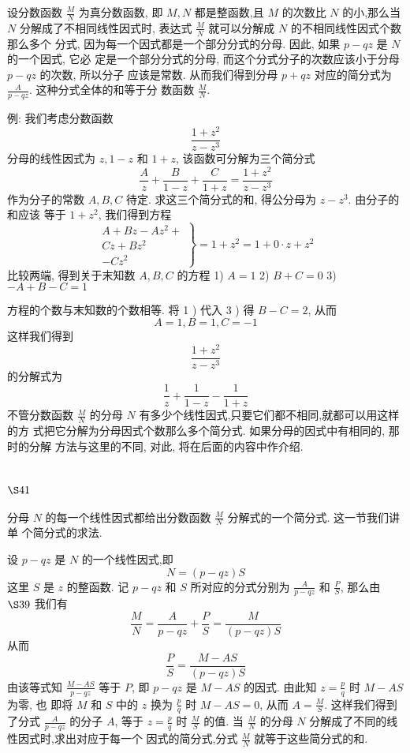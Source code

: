 设分数函数 $\frac{M}{N}$ 为真分数函数, 即 $M, N$ 都是整函数,且 $M$ 的次数比 $N$ 的小,那么当 $N$ 分解成了不相同线性因式时, 表达式 $\frac{M}{N}$ 就可以分解成 $N$ 的不相同线性因式个数那么多个 分式, 因为每一个因式都是一个部分分式的分母. 因此, 如果 $p-q z$ 是 $N$ 的一个因式, 它必 定是一个部分分式的分母, 而这个分式分子的次数应该小于分母 $p-q z$ 的次数, 所以分子 应该是常数. 从而我们得到分母 $p+q z$ 对应的简分式为 $\frac{A}{p-q z}$. 这种分式全体的和等于分 数函数 $\frac{M}{N}$.

例: 我们考虑分数函数
\[
\frac{1+z^{2}}{z-z^{3}}
\]
分母的线性因式为 $z, 1-z$ 和 $1+z$, 该函数可分解为三个简分式
\[
\frac{A}{z}+\frac{B}{1-z}+\frac{C}{1+z}=\frac{1+z^{2}}{z-z^{3}}
\]
作为分子的常数 $A, B, C$ 待定. 求这三个简分式的和, 得公分母为 $z-z^{3}$. 由分子的和应该 等于 $1+z^{2}$, 我们得到方程
\[
\left.\begin{array}{l}
A+B z-A z^{2}+ \\
C z+B z^{2} \\
-C z^{2}
\end{array}\right\}=1+z^{2}=1+0 \cdot z+z^{2}
\]
比较两端, 得到关于末知数 $A, B, C$ 的方程
1) $A=1$
2) $B+C=0$
3) $-A+B-C=1$

方程的个数与末知数的个数相等. 将 1 ) 代入 3 ) 得 $B-C=2$, 从而 
\[
A=1, B=1, C=-1
\]
这样我们得到
\[
\frac{1+z^{2}}{z-z^{3}}
\]
的分解式为
\[
\frac{1}{z}+\frac{1}{1-z}-\frac{1}{1+z}
\]
不管分数函数 $\frac{M}{N}$ 的分母 $N$ 有多少个线性因式,只要它们都不相同,就都可以用这样的方 式把它分解为分母因式个数那么多个简分式. 如果分母的因式中有相同的, 那时的分解 方法与这里的不同, 对此, 将在后面的内容中作介绍.

\section{$\S 41$}

分母 $N$ 的每一个线性因式都给出分数函数 $\frac{M}{N}$ 分解式的一个简分式. 这一节我们讲单 个简分式的求法.

设 $p-q z$ 是 $N$ 的一个线性因式,即
\[
N=(p-q z) S
\]
这里 $S$ 是 $z$ 的整函数. 记 $p-q z$ 和 $S$ 所对应的分式分别为 $\frac{A}{p-q z}$ 和 $\frac{P}{S}$, 那么由 $\S 39$ 我们有
\[
\frac{M}{N}=\frac{A}{p-q z}+\frac{P}{S}=\frac{M}{(p-q z) S}
\]
从而
\[
\frac{P}{S}=\frac{M-A S}{(p-q z) S}
\]
由该等式知 $\frac{M-A S}{p-q z}$ 等于 $P$, 即 $p-q z$ 是 $M-A S$ 的因式. 由此知 $z=\frac{p}{q}$ 时 $M-A S$ 为零, 也 即将 $M$ 和 $S$ 中的 $z$ 换为 $\frac{p}{q}$ 时 $M-A S=0$, 从而 $A=\frac{M}{S}$. 这样我们得到了分式 $\frac{A}{p-q z}$ 的分子 $A$, 等于 $z=\frac{p}{q}$ 时 $\frac{M}{S}$ 的值. 当 $\frac{M}{N}$ 的分母 $N$ 分解成了不同的线性因式时,求出对应于每一个 因式的简分式,分式 $\frac{M}{N}$ 就等于这些简分式的和.

